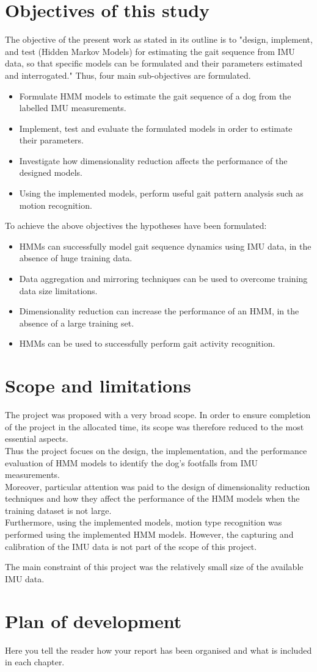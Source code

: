 \section{Objectives of this study}
The objective of the present work as stated in its outline is to "design, implement, and test (Hidden Markov Models) for estimating the gait sequence
from IMU data, so that specific models can be formulated and their
parameters estimated and interrogated." Thus, four main sub-objectives are formulated.
\begin{itemize}
	\item Formulate HMM models to estimate the gait sequence of a dog from the labelled IMU measurements.
	\item Implement, test and evaluate the formulated models in order to estimate their parameters.
	\item Investigate how dimensionality reduction affects the performance of the designed models.
	\item Using the implemented models, perform useful gait pattern analysis such as motion recognition.
\end{itemize}

To achieve the above objectives the hypotheses have been formulated:
\begin{itemize}
	\item HMMs can successfully model gait sequence dynamics using IMU data, in the absence of huge training data.
	\item Data aggregation and mirroring techniques can be used to overcome training data size limitations.
	\item Dimensionality reduction can increase the performance of an HMM, in the absence of a large training set.
	\item HMMs can be used to successfully perform gait activity recognition.
\end{itemize}


\section{Scope and limitations}
The project was proposed with a very broad scope. In order to ensure completion of the project in the allocated time, its scope was therefore reduced to the most essential aspects.\\
Thus the project focues on the design, the implementation, and the performance evaluation of HMM models to identify the dog's footfalls from IMU measurements.\\
Moreover, particular attention was paid to the design of dimensionality reduction techniques and how they affect the performance of the HMM models when the training dataset is not large.\\
Furthermore, using the implemented models, motion type recognition was performed using the implemented HMM models. However, the capturing and calibration of the IMU data is not part of the scope of this project.

The main constraint of this project was the relatively small size of the available IMU data.
\section{Plan of development}
Here you tell the reader how your report has been organised and what is included in each
chapter.
